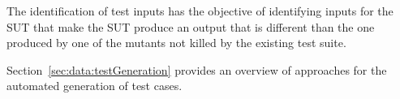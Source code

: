 The identification of test inputs has the objective of identifying inputs for the SUT that make the SUT produce an output that is different than the one produced by one of the mutants not killed by the existing test suite.


Section~\ref{sec:data:testGeneration} provides an overview of approaches for the automated generation of test cases.

